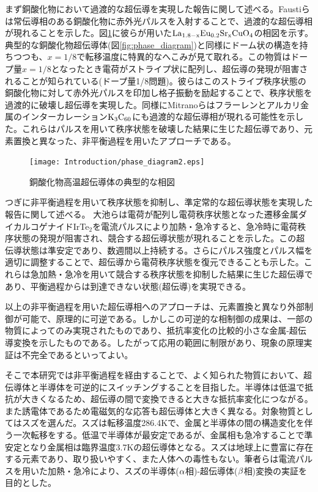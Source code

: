 まず銅酸化物において過渡的な超伝導を実現した報告に関して述べる。Faustiらは常伝導相のある銅酸化物に赤外光パルスを入射することで、過渡的な超伝導相が現れることを示した\cite{Fausti,Hunt2015}。図\ref{fig:phase_diagram2}に彼らが用いた$\rm La_{1.8-x}Eu_{0.2}Sr_{x}CuO_4$の相図を示す\cite{Cavalleri2018}。典型的な銅酸化物超伝導体(図\ref{fig:phase_diagram})と同様にドーム状の構造を持ちつつも、$x=1/8$で転移温度に特異的なへこみが見て取れる。この物質はドープ量$x=1/8$となったとき電荷がストライプ状に配列し、超伝導の発現が阻害されることが知られている(ドープ量1/8問題)。彼らはこのストライプ秩序状態の銅酸化物に対して赤外光パルスを印加し格子振動を励起することで、秩序状態を過渡的に破壊し超伝導を実現した。同様にMitranoらはフラーレンとアルカリ金属のインターカレーション$\rm K_3C_{60}$にも過渡的な超伝導相が現れる可能性を示した\cite{Mitrano2016}。これらはパルスを用いて秩序状態を破壊した結果に生じた超伝導であり、元素置換と異なった、非平衡過程を用いたアプローチである。
\begin{figure}[htb]
    \begin{center}
   \texttt{[image: Introduction/phase\_diagram2.eps]}
  \end{center}
  \caption{銅酸化物高温超伝導体の典型的な相図\cite{Cavalleri2018}}
  \label{fig:phase_diagram2}
\end{figure}

つぎに非平衡過程を用いて秩序状態を抑制し、準定常的な超伝導状態を実現した報告に関して述べる。
大池らは電荷が配列し電荷秩序状態となった遷移金属ダイカルコゲナイドIrTe$_2$を電流パルスにより加熱・急冷すると、急冷時に電荷秩序状態の発現が阻害され、競合する超伝導状態が現れることを示した\cite{Oike}。この超伝導状態は準安定であり、数週間以上持続する。さらにパルス強度とパルス幅を適切に調整することで、超伝導から電荷秩序状態を復元できることも示した。これらは急加熱・急冷を用いて競合する秩序状態を抑制した結果に生じた超伝導であり、平衡過程からは到達できない状態(超伝導)を実現できる。

以上の非平衡過程を用いた超伝導相へのアプローチは、元素置換と異なり外部制御が可能で、原理的に可逆である。しかしこの可逆的な相制御の成果は、一部の物質によってのみ実現されたものであり、抵抗率変化の比較的小さな金属-超伝導変換を示したものである。したがって応用の範囲に制限があり、現象の原理実証は不完全であるといってよい。

そこで本研究では非平衡過程を経由することで、よく知られた物質において、超伝導体と半導体を可逆的にスイッチングすることを目指した。半導体は低温で抵抗が大きくなるため、超伝導の間で変換できると大きな抵抗率変化につながる。また誘電体であるため電磁気的な応答も超伝導体と大きく異なる。対象物質としてはスズを選んだ。スズは転移温度286.4Kで、金属と半導体の間の構造変化を伴う一次転移をする。低温で半導体が最安定であるが、金属相も急冷することで準安定となり金属相は臨界温度3.7Kの超伝導体となる。スズは地球上に豊富に存在する元素であり、取り扱いやすく、また人体への毒性もない。筆者らは電流パルスを用いた加熱・急冷により、スズの半導体($\rm \alpha$相)-超伝導体($\rm \beta$相)変換の実証を目的とした。

